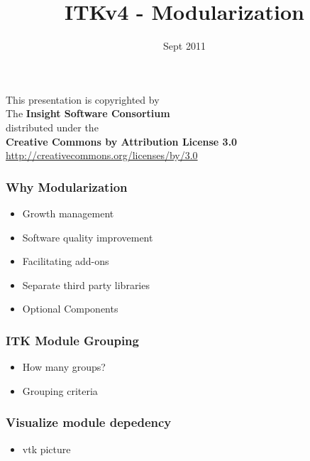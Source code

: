 \documentclass[18pt]{beamer}
\begin{document}
\title[ITKv4]{ITKv4 - Modularization}
\date[Sept 2011]{Sept 2011}

\begin{frame}
\titlepage
\end{frame}


{
\begin{frame}[plain]
\center
\begin{center}
This presentation is copyrighted by\\
The \textbf{Insight Software Consortium}\\
\bigskip
distributed under the\\
\textbf{Creative Commons by Attribution License 3.0}\\
\url{http://creativecommons.org/licenses/by/3.0}\\
\end{center}
\end{frame}
}


\begin{frame}
  \tableofcontents
\end{frame}

\begin{frame}
\frametitle{Why Modularization}
\begin{itemize}
\item Growth management
\pause
\item Software quality improvement
\pause
\item Facilitating add-ons
\pause
\item Separate third party libraries
\pause
\item Optional Components
\end{itemize}
\end{frame}


\begin{frame}
\frametitle{ITK Module Grouping}
\begin{itemize}
\item  How many groups?
\pause
\item  Grouping criteria
\pause
\end{itemize}
\end{frame}

\begin{frame}
\frametitle{ Visualize module depedency}
\begin{itemize}
\item  vtk picture
\end{itemize}
\end{frame}
\end{document}
